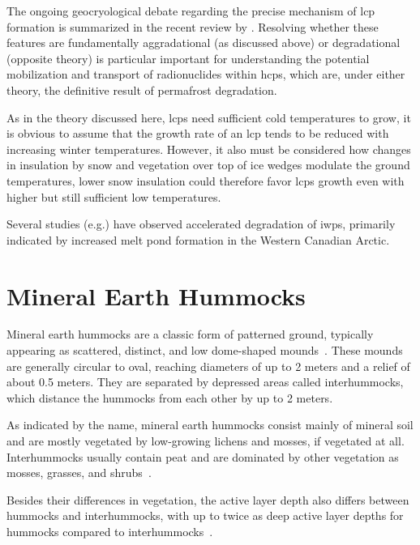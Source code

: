 The ongoing geocryological debate regarding the precise mechanism of \gls{lcp} formation is summarized in the recent review by \citet{shurFormationLowCenteredIceWedge2025}. 
Resolving whether these features are fundamentally aggradational (as discussed above) or degradational (opposite theory) is particular important for understanding the potential mobilization and transport of radionuclides within \glspl{hcp}, which are, under either theory, the definitive result of permafrost degradation.

As in the theory discussed here, \glspl{lcp} need sufficient cold temperatures to grow, it is obvious to assume that the growth rate of an \gls{lcp} tends to be reduced with increasing winter temperatures. 
However, it also must be considered how changes in insulation by snow and vegetation over top of ice wedges modulate the ground temperatures, lower snow insulation could therefore favor \glspl{lcp} growth even with higher but still sufficient low temperatures.

Several studies (e.g.\citep{fraserRecentPondingUpland2023,steedmanSpatioTemporalVariationHighCentre2017}) have observed accelerated degradation of \glspl{iwp}, primarily indicated by increased melt pond formation in the Western Canadian Arctic.

\section{Mineral Earth Hummocks}
Mineral earth hummocks are a classic form of patterned ground, typically appearing as scattered, distinct, and low dome-shaped mounds~\citep{kokeljStructureDynamicsEarth2007}. 
These mounds are generally circular to oval, reaching diameters of up to 2 meters and a relief of about 0.5 meters. 
They are separated by depressed areas called interhummocks, which distance the hummocks from each other by up to 2 meters.

As indicated by the name, mineral earth hummocks consist mainly of mineral soil and are mostly vegetated by low-growing lichens and mosses, if vegetated at all. 
Interhummocks usually contain peat and are dominated by other vegetation as mosses, grasses, and shrubs~\citep{dakinHowDryYear2023,kokeljStructureDynamicsEarth2007,quintonSubsurfaceDrainageHummockcovered2000}.

Besides their differences in vegetation, the active layer depth also differs between hummocks and interhummocks, with up to twice as deep active layer depths for hummocks compared to interhummocks~\citep{kokeljStructureDynamicsEarth2007}.

